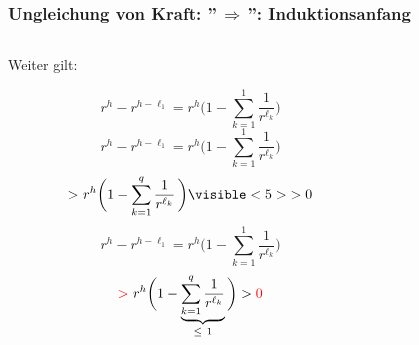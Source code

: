 \documentclass{beamer}
\begin{document}
\begin{frame}[t]
    \frametitle{Ungleichung von Kraft: ''$\,\Longrightarrow\,$'': Induktionsanfang}
    \begin{columns}
    \begin{column}{0.5\textwidth}
        Weiter gilt:
        \begin{overprint}
            $$
                r^h - r^{h - \ell_1} = r^h\bigg(1 - \sum_{k=1}^{1} \frac{1}{r^{\ell_k}}\bigg)
            $$
            $$
                r^h - r^{h - \ell_1} = r^h\bigg(1 - \sum_{k=1}^{1} \frac{1}{r^{\ell_k}}\bigg)
            $$
            $$
                {>}\ r^h\bigg(1 - \sum_{k=1}^{q} \frac{1}{r^{\ell_k}}\,\bigg )\visible<5>{> 0}
            $$
            $$
                r^h - r^{h - \ell_1} = r^h\bigg(1 - \sum_{k=1}^{1} \frac{1}{r^{\ell_k}}\bigg)
            $$
            $$
                {\color{red} >}\ r^h\bigg(1 - \underbrace{\sum_{k=1}^{q} \frac{1}{r^{\ell_k}}}_{\leq\ 1}\bigg)
                > {\color{red}0}
            $$
        \end{overprint}
    \end{column}

        \begin{column}{0.55\textwidth}
        \onslide
            \begin{center}
\end{center}
\end{column}
\end{columns}
\end{frame}
\end{document}
